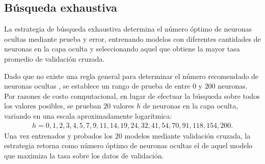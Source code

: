 %
\subsection{Búsqueda exhaustiva}
%
La estrategia de búsqueda exhaustiva determina el número óptimo de
neuronas ocultas mediante prueba y error, entrenando modelos con
diferentes cantidades de neuronas en la capa oculta y seleccionando
aquel que obtiene la mayor tasa \GM{} promedio de validación cruzada.

Dado que no existe una regla general para determinar el número
recomendado de neuronas ocultas \cite{nnfaq3}, se establece un rango
de prueba de entre $0$ y $200$ neuronas.
Por razones de costo computacional, en lugar de efectuar la búsqueda
sobre todos los valores posibles, se prueban $20$ valores $h$ de
neuronas en la capa oculta, variando en una escala aproximadamente
logarítmica:
%
\begin{align}
  \label{mlp-hidden-tries}
  h=0,1,2,3,4,5,7,9,11,14,19,24,32,41,54,70,91,118,154,200.
\end{align}
%
Una vez entrenados y probados los $20$ modelos mediante validación
cruzada, la estrategia retorna como número óptimo de neuronas ocultas
el de aquel modelo que maximiza la tasa \GM{} sobre los datos de
validación.
